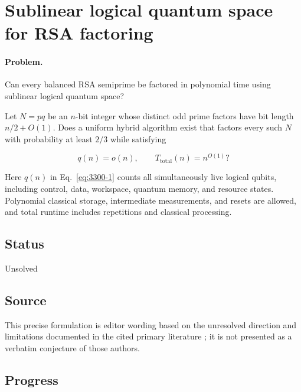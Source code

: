 \section{Sublinear logical quantum space for RSA factoring}
\label{sec:op_330054883db95e6b}

\paragraph{Problem.}
Can every balanced RSA semiprime be factored in polynomial time using sublinear logical quantum space?

Let $N=pq$ be an $n$-bit integer whose distinct odd prime factors have bit length $n/2+O(1)$. Does a uniform hybrid algorithm exist that factors every such $N$ with probability at least $2/3$ while satisfying

\begin{equation}
q(n)=o(n),
\qquad
T_{\mathrm{total}}(n)=n^{O(1)}?
\label{eq:3300-1}
\end{equation}

Here $q(n)$ in Eq.~\eqref{eq:3300-1} counts all simultaneously live logical qubits, including control, data, workspace, quantum memory, and resource states. Polynomial classical storage, intermediate measurements, and resets are allowed, and total runtime includes repetitions and classical processing.

\subsection*{Status}

Unsolved

\subsection*{Source}

This precise formulation is editor wording based on the unresolved direction and limitations documented in the cited primary literature ; it is not presented as a verbatim conjecture of those authors.

\subsection*{Progress}

